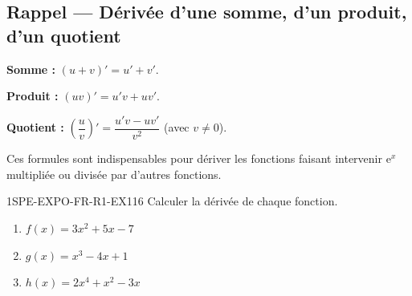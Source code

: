 

\subsection*{Rappel — Dérivée d'une somme, d'un produit, d'un quotient}

\textbf{Somme :} $(u + v)' = u' + v'$.

\textbf{Produit :} $(uv)' = u'v + uv'$.

\textbf{Quotient :} $\left(\dfrac{u}{v}\right)' = \dfrac{u'v - uv'}{v^2}$ \quad (avec $v
\neq 0$).

Ces formules sont indispensables pour dériver les fonctions faisant intervenir $\mathrm{e}^x$ multipliée ou divisée par d'autres fonctions.


\begin{exercice}{1SPE-EXPO-FR-R1-EX1}{1}{6}
Calculer la dérivée de chaque fonction.
\begin{enumerate}
  \item $f(x) = 3x^2 + 5x - 7$
  \item $g(x) = x^3 - 4x + 1$
  \item $h(x) = 2x^4 + x^2 - 3x$
\end{enumerate}
\end{exercice}



